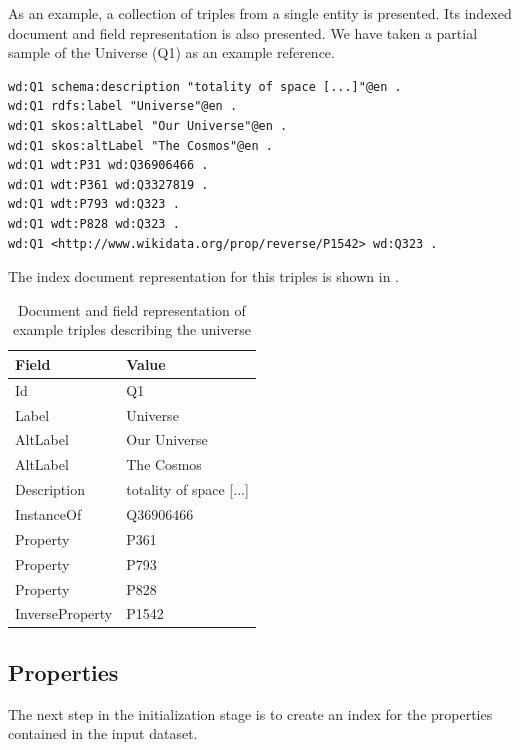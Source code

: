 \begin{example}
As an example, a collection of triples from a single entity is presented. Its indexed document and field representation is also presented. We have taken a partial sample of the Universe (Q1) as an example reference.

\begin{verbatim}
wd:Q1 schema:description "totality of space [...]"@en .
wd:Q1 rdfs:label "Universe"@en .
wd:Q1 skos:altLabel "Our Universe"@en .
wd:Q1 skos:altLabel "The Cosmos"@en .
wd:Q1 wdt:P31 wd:Q36906466 .
wd:Q1 wdt:P361 wd:Q3327819 .
wd:Q1 wdt:P793 wd:Q323 .
wd:Q1 wdt:P828 wd:Q323 .
wd:Q1 <http://www.wikidata.org/prop/reverse/P1542> wd:Q323 .
\end{verbatim}

The index document representation for this triples is shown in .

\begin{table}[h!]
\centering
\begin{tabular}{ll}
Field           & Value                    \\ 
\hline
Id              & Q1                       \\
Label           & Universe                 \\
AltLabel        & Our Universe             \\
AltLabel        & The Cosmos               \\
Description     & totality of space [...]  \\
InstanceOf      & Q36906466                \\
Property        & P361                     \\
Property        & P793                     \\
Property        & P828                     \\
InverseProperty & P1542                   
\end{tabular}
\caption{Document and field representation of example triples describing the universe}
\label{table:triplesToDocument}

\end{table}

\end{example}

\subsection{Properties}
The next step in the initialization stage is to create an index for the properties contained in the input dataset.

